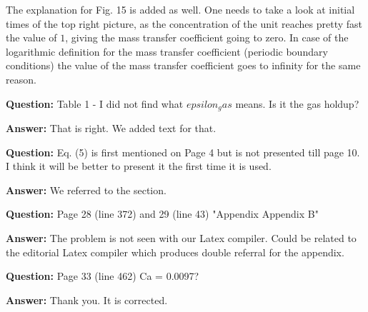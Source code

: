 \documentclass{article}
\begin{document}
The explanation for Fig. 15 is added as well. One needs to take a look at initial times of the top right picture, as the concentration of the unit reaches pretty fast the value of $1$, giving the mass transfer coefficient going to zero. In case of the logarithmic definition for the mass transfer coefficient (periodic boundary conditions) the value of the mass transfer coefficient goes to infinity for the same reason.

\textbf{Question:} Table 1 - I did not find what $epsilon_gas$ means. Is it the gas holdup?

\textbf{Answer:} That is right. We added text for that.

\textbf{Question:} Eq. (5) is first mentioned on Page 4 but is not presented till page 10. I think it will be better to present it the first time it is used.

\textbf{Answer:} We referred to the section.
 
\textbf{Question:} Page 28 (line 372) and 29 (line 43) "Appendix Appendix B"

\textbf{Answer:} The problem is not seen with our Latex compiler. Could be related to the editorial Latex compiler which produces double referral for the appendix.

\textbf{Question:} Page 33 (line 462) Ca = 0.0097?

\textbf{Answer:} Thank you. It is corrected.




\end{document}
